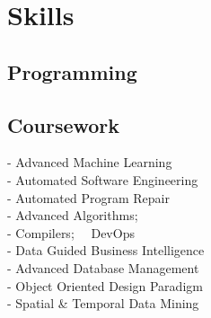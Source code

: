 \documentclass[]{bigfatnoob-resume}
\begin{document}
\begin{minipage}[t]{0.33\textwidth}

\section{Skills}
\subsection{Programming}
\vspace{1mm}
\vspace{1mm}

\sectionsep


\subsection{Coursework}
- Advanced Machine Learning \\
- Automated Software Engineering \\
- Automated Program Repair\\
- Advanced Algorithms;\\
- Compilers; \ \  DevOps \\
- Data Guided Business Intelligence\\
- Advanced Database Management \\
- Object Oriented Design Paradigm\\
- Spatial \& Temporal Data Mining\\
\sectionsep



\end{minipage}
\end{document}
